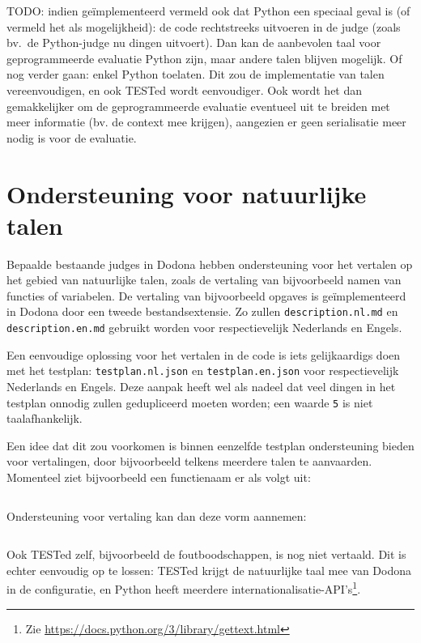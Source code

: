 TODO: indien geïmplementeerd vermeld ook dat Python een speciaal geval is (of vermeld het als mogelijkheid): de code rechtstreeks uitvoeren in de judge (zoals bv.\ de Python-judge nu dingen uitvoert).
Dan kan de aanbevolen taal voor geprogrammeerde evaluatie Python zijn, maar andere talen blijven mogelijk.
Of nog verder gaan: enkel Python toelaten. Dit zou de implementatie van talen vereenvoudigen, en ook TESTed wordt eenvoudiger.
Ook wordt het dan gemakkelijker om de geprogrammeerde evaluatie eventueel uit te breiden met meer informatie (bv. de context mee krijgen), aangezien er geen serialisatie meer nodig is voor de evaluatie.

\section{Ondersteuning voor natuurlijke talen}\label{sec:ondersteuning-voor-natuurlijke-talen}

Bepaalde bestaande judges in Dodona hebben ondersteuning voor het vertalen op het gebied van natuurlijke talen, zoals de vertaling van bijvoorbeeld namen van functies of variabelen.
De vertaling van bijvoorbeeld opgaves is geïmplementeerd in Dodona door een tweede bestandsextensie.
Zo zullen \texttt{description.nl.md} en \texttt{description.en.md} gebruikt worden voor respectievelijk Nederlands en Engels.

Een eenvoudige oplossing voor het vertalen in de code is iets gelijkaardigs doen met het testplan: \texttt{testplan.nl.json} en \texttt{testplan.en.json} voor respectievelijk Nederlands en Engels.
Deze aanpak heeft wel als nadeel dat veel dingen in het testplan onnodig zullen gedupliceerd moeten worden;
een waarde \texttt{5} is niet taalafhankelijk.

Een idee dat dit zou voorkomen is binnen eenzelfde testplan ondersteuning bieden voor vertalingen, door bijvoorbeeld telkens meerdere talen te aanvaarden.
Momenteel ziet bijvoorbeeld een functienaam er als volgt uit:

\inputminted{json}{code/example-name.json}

Ondersteuning voor vertaling kan dan deze vorm aannemen:

\inputminted{json}{code/example-name-trans.json}

Ook TESTed zelf, bijvoorbeeld de foutboodschappen, is nog niet vertaald.
Dit is echter eenvoudig op te lossen: TESTed krijgt de natuurlijke taal mee van Dodona in de configuratie, en Python heeft meerdere internationalisatie-API's\footnote{Zie \url{https://docs.python.org/3/library/gettext.html}}.

